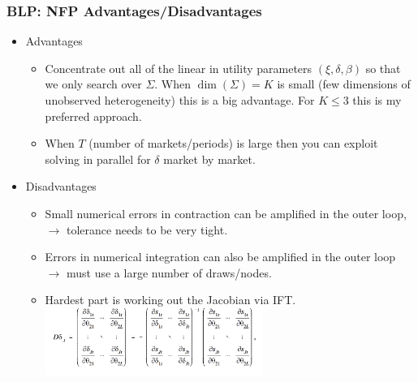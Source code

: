 \documentclass[xcolor=pdftex,dvipsnames,table,mathserif,aspectratio=169]{beamer}
\begin{document}
\begin{frame}
\frametitle{BLP: NFP Advantages/Disadvantages}
\begin{itemize}
\item Advantages
\begin{itemize}
\item Concentrate out all of the linear in utility parameters $(\xi,\delta,\beta)$ so that we only search over $\Sigma$. When $\dim(\Sigma)=K$ is small (few dimensions of unobserved heterogeneity) this is a big advantage. For $K \leq 3$ this is my preferred approach.
\item When $T$ (number of markets/periods) is large then you can exploit solving in parallel for $\delta$ market by market.
\end{itemize}
\item Disadvantages
\begin{itemize}
\item Small numerical errors in contraction can be amplified in the outer loop, $\rightarrow$ tolerance needs to be very tight.
\item Errors in numerical integration can also be amplified in the outer loop $\rightarrow$ must use a large number of draws/nodes.
\item Hardest part is working out the Jacobian via IFT.
\includegraphics[width=2.8in]{resources/implicit_function.png}\\
\end{itemize}
\end{itemize}
\end{frame}
\end{document}

